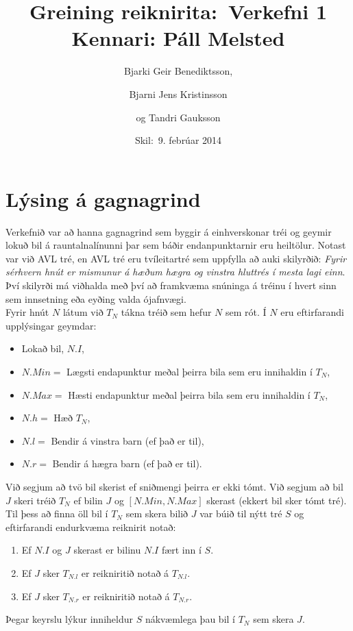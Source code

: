 \documentclass[a4paper,oneside]{article}
\title{
    Greining reiknirita:\ Verkefni 1
    \\\small{Kennari: Páll Melsted}
}
\author{Bjarki Geir Benediktsson, \and  Bjarni Jens Kristinsson \and og Tandri Gauksson}
\date{\small{Skil:\ 9. febrúar 2014}}
\begin{document}
\maketitle

\section{Lýsing á gagnagrind}

Verkefnið var að hanna gagnagrind sem byggir á einhverskonar tréi og geymir lokuð bil á rauntalnalínunni þar sem báðir endanpunktarnir eru heiltölur.
Notast var við AVL tré, en AVL tré eru tvíleitartré sem uppfylla að auki skilyrðið: \textit{Fyrir sérhvern hnút er mismunur á hæðum hægra og vinstra hluttrés í mesta lagi einn}.
Því skilyrði má viðhalda með því að framkvæma snúninga á tréinu í hvert sinn sem innsetning eða eyðing valda ójafnvægi.\\

Fyrir hnút $N$ látum við $T_N$ tákna tréið sem hefur $N$ sem rót. Í $N$ eru eftirfarandi upplýsingar geymdar:
\begin{itemize}
	\item Lokað bil, $N.I$,
	\item $N.Min =$ Lægsti endapunktur meðal þeirra bila sem eru innihaldin í $T_N$,
	\item $N.Max =$ Hæsti endapunktur meðal þeirra bila sem eru innihaldin í $T_N$,
	\item $N.h = $ Hæð $T_N$,
	\item $N.l = $ Bendir á vinstra barn (ef það er til),
	\item $N.r = $ Bendir á hægra barn (ef það er til).
\end{itemize}

Við segjum að tvö bil skerist ef sniðmengi þeirra er ekki tómt.
Við segjum að bil $J$ skeri tréið $T_N$ ef bilin $J$ og $[N.Min, N.Max]$ skerast (ekkert bil sker tómt tré).
Til þess að finna öll bil í $T_N$ sem skera bilið $J$ var búið til nýtt tré $S$ og eftirfarandi endurkvæma reiknirit notað:
\begin{enumerate}
	\item Ef $N.I$ og $J$ skerast er bilinu $N.I$ fært inn í $S$.
	\item Ef $J$ sker $T_{N.l}$ er reikniritið notað á $T_{N.l}$.
	\item Ef $J$ sker $T_{N.r}$ er reikniritið notað á $T_{N.r}$.
\end{enumerate}
Þegar keyrslu lýkur inniheldur $S$ nákvæmlega þau bil í $T_N$ sem skera $J$.\\
\end{document}
